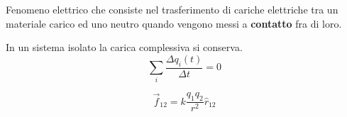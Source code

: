 \begin{multicols}{3}
  Fenomeno elettrico che consiste nel trasferimento di cariche elettriche tra
  un materiale carico ed uno neutro quando vengono messi a \textbf{contatto}
  fra di loro.

  In un sistema isolato la carica complessiva si conserva.
  \begin{equation}
    \label{eq:conservazione-carica}
    \sum_i \frac{\Delta q_i(t)}{\Delta t} = 0
  \end{equation}

  \begin{equation}
    \label{eq:legge-coulomb}
    \vec{f}_{12} = k\frac{q_1q_2}{r^2}\hat{r}_{12}
  \end{equation}
\end{multicols}

